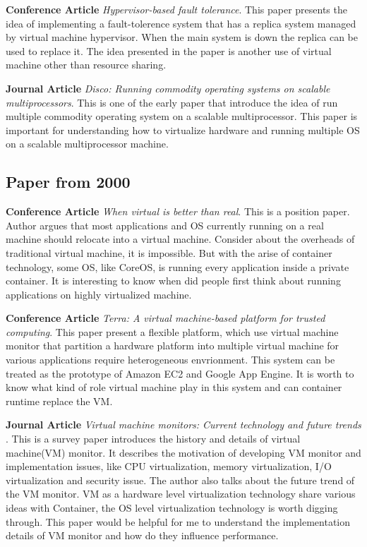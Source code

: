 \documentclass{article}
\begin{document}
\medskip

\textbf{Conference Article} \emph{Hypervisor-based fault tolerance}\cite{bressoud1995hypervisor}.
This paper presents the idea of implementing a fault-tolerence system that has a replica system 
managed by virtual machine hypervisor. When the main system is down the replica can be used to 
replace it. The idea presented in the paper is another use of virtual machine other than 
resource sharing.

\medskip 

\textbf{Journal Article} \emph{Disco: Running commodity operating systems on scalable 
multiprocessors}\cite{bugnion1997disco}. This is one of the early paper that introduce the 
idea of run multiple commodity operating system on a scalable multiprocessor. This paper is 
important for understanding how to virtualize hardware and running multiple OS on a scalable 
multiprocessor machine.

\subsection{Paper from 2000}

\textbf{Conference Article} \emph{When virtual is better than real}\cite{chen2001virtual}. This is
a position paper. Author argues that most applications and OS currently running on a real machine 
should relocate into a virtual machine. Consider about the overheads of traditional virtual machine,
it is impossible. But with the arise of container technology, some OS, like CoreOS, is running 
every application inside a private container. It is interesting to know when did people first think 
about running applications on highly virtualized machine.

\medskip

\textbf{Conference Article} \emph{Terra: A virtual machine-based platform for trusted 
computing}\cite{garfinkel2003terra}. This paper present a flexible platform, which use virtual 
machine monitor that partition a hardware platform into multiple virtual machine for various
applications require heterogeneous envrionment. This system can be treated as the prototype of
Amazon EC2 and Google App Engine. It is worth to know what kind of role virtual machine play in 
this system and can container runtime replace the VM.

\medskip

\textbf{Journal Article} \emph{Virtual machine monitors: Current technology and future trends}
\cite{rosenblum2005virtual}. This is a survey paper introduces the history and details of virtual 
machine(VM) monitor. It describes the motivation of developing VM monitor and implementation 
issues, like CPU virtualization, memory virtualization, I/O virtualization and security issue. The
author also talks about the future trend of the VM monitor. VM as a hardware level virtualization
technology share various ideas with Container, the OS level virtualization technology is worth 
digging through. This paper would be helpful for me to understand the implementation details of VM 
monitor and how do they influence performance.
\end{document}

